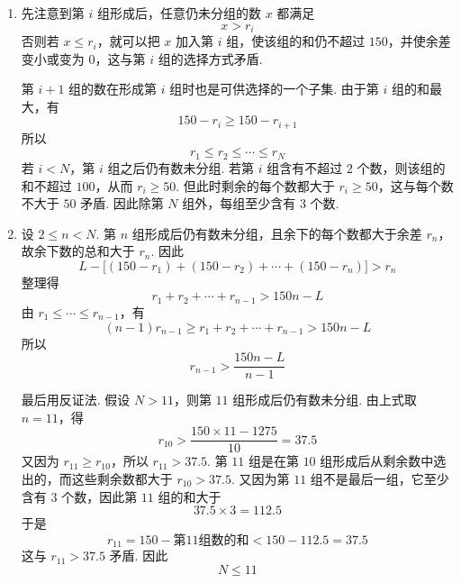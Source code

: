 \begin{solution}
\begin{enumerate}
\item
先注意到第 \(i\) 组形成后，任意仍未分组的数 \(x\) 都满足
\[
x>r_i
\]
否则若 \(x\leqslant r_i\)，就可以把 \(x\) 加入第 \(i\) 组，使该组的和仍不超过 \(150\)，并使余差变小或变为 \(0\)，这与第 \(i\) 组的选择方式矛盾.

第 \(i+1\) 组的数在形成第 \(i\) 组时也是可供选择的一个子集. 由于第 \(i\) 组的和最大，有
\[
150-r_i\geqslant150-r_{i+1}
\]
所以
\[
r_1\leqslant r_2\leqslant\cdots\leqslant r_N
\]
若 \(i<N\)，第 \(i\) 组之后仍有数未分组. 若第 \(i\) 组含有不超过 \(2\) 个数，则该组的和不超过 \(100\)，从而 \(r_i\geqslant50\). 但此时剩余的每个数都大于 \(r_i\geqslant50\)，这与每个数不大于 \(50\) 矛盾. 因此除第 \(N\) 组外，每组至少含有 \(3\) 个数.

\item
设 \(2\leqslant n<N\). 第 \(n\) 组形成后仍有数未分组，且余下的每个数都大于余差 \(r_n\)，故余下数的总和大于 \(r_n\). 因此
\[
L-\bigl[(150-r_1)+(150-r_2)+\cdots+(150-r_n)\bigr]>r_n
\]
整理得
\[
r_1+r_2+\cdots+r_{n-1}>150n-L
\]
由 \(r_1\leqslant\cdots\leqslant r_{n-1}\)，有
\[
(n-1)r_{n-1}\geqslant r_1+r_2+\cdots+r_{n-1}>150n-L
\]
所以
\[
r_{n-1}>\dfrac{150n-L}{n-1}
\]

最后用反证法. 假设 \(N>11\)，则第 \(11\) 组形成后仍有数未分组. 由上式取 \(n=11\)，得
\[
r_{10}>\dfrac{150\times11-1275}{10}=37.5
\]
又因为 \(r_{11}\geqslant r_{10}\)，所以 \(r_{11}>37.5\). 第 \(11\) 组是在第 \(10\) 组形成后从剩余数中选出的，而这些剩余数都大于 \(r_{10}>37.5\). 又因为第 \(11\) 组不是最后一组，它至少含有 \(3\) 个数，因此第 \(11\) 组的和大于
\[
37.5\times3=112.5
\]
于是
\[
r_{11}=150-\text{第11组数的和}<150-112.5=37.5
\]
这与 \(r_{11}>37.5\) 矛盾. 因此
\[
N\leqslant11
\]
\end{enumerate}
\end{solution}

